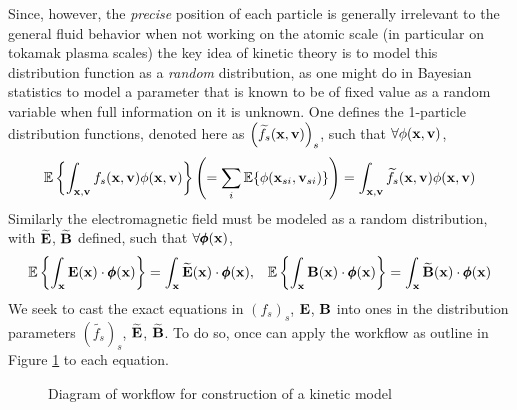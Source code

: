     Since, however, the \emph{precise} position of each particle is generally irrelevant to the general fluid behavior when not working on the atomic scale (in particular on tokamak plasma scales) the key idea of kinetic theory is to model this distribution function as a \emph{random} distribution, as one might do in Bayesian statistics to model a parameter that is known to be of fixed value as a random variable when full information on it is unknown. One defines the 1-particle distribution functions, denoted here as $\left(\widetilde{f_{s}}(\mathbf{x}, \mathbf{v})\right)_{s}$, such that $\forall \phi(\mathbf{x}, \mathbf{v})$,
    \begin{equation}
        \mathbb{E}\left\{\int_{\mathbf{x}, \mathbf{v}}f_{s}(\mathbf{x}, \mathbf{v})\phi(\mathbf{x}, \mathbf{v})\right\}
        \left(=  \sum_{i}\mathbb{E}\{\phi(\mathbf{x}_{si}, \mathbf{v}_{si})\}\right)
        =  \int_{\mathbf{x}, \mathbf{v}}\widetilde{f_{s}}(\mathbf{x}, \mathbf{v})\phi(\mathbf{x}, \mathbf{v})
    \end{equation}
    Similarly the electromagnetic field must be modeled as a random distribution, with $\widetilde{\mathbf{E}}$, $\widetilde{\mathbf{B}}$ defined, such that $\forall \pmb{\mathsf{\phi}}(\mathbf{x})$,
    \begin{align}
        \mathbb{E}\left\{\int_{\mathbf{x}}\mathbf{E}(\mathbf{x})\cdot\pmb{\mathsf{\phi}}(\mathbf{x})\right\}  =  \int_{\mathbf{x}}\widetilde{\mathbf{E}}(\mathbf{x})\cdot\pmb{\mathsf{\phi}}(\mathbf{x}),  && 
        \mathbb{E}\left\{\int_{\mathbf{x}}\mathbf{B}(\mathbf{x})\cdot\pmb{\mathsf{\phi}}(\mathbf{x})\right\}  =  \int_{\mathbf{x}}\widetilde{\mathbf{B}}(\mathbf{x})\cdot\pmb{\mathsf{\phi}}(\mathbf{x})
    \end{align}
    We seek to cast the exact equations in $(f_{s})_{s}$, $\mathbf{E}$, $\mathbf{B}$ into ones in the distribution parameters $\left(\widetilde{f_{s}}\right)_{s}$, $\widetilde{\mathbf{E}}$, $\widetilde{\mathbf{B}}$. To do so, once can apply the workflow as outline in Figure \ref{fig:kinetic model construction workflow} to each equation.
    \begin{figure}[!h]
        \centering
        \caption{Diagram of workflow for construction of a kinetic model}
        \label{fig:kinetic model construction workflow}
    \end{figure}

